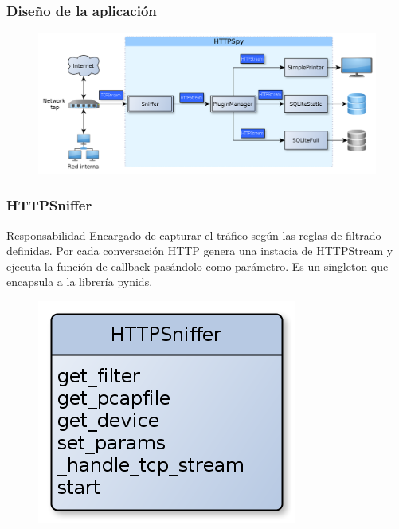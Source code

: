 \documentclass[10pt,a4paper]{beamer}
\begin{document}
\begin{frame}

	\frametitle{Diseño de la aplicación}

	\begin{figure}[hbtp]
		\includegraphics[scale=0.22]{img/modelo.png}
	\end{figure}

\end{frame}

\begin{frame}

	\frametitle{HTTPSniffer}
	\begin{block}{Responsabilidad}
		Encargado de capturar el tráfico según las reglas de filtrado definidas.
		Por cada conversación HTTP genera una instacia de HTTPStream y ejecuta la función de callback pasándolo como parámetro. Es un singleton que encapsula a la librería pynids.
	\end{block}
	\begin{figure}[hbtp]
		\includegraphics[scale=0.40]{img/HTTPSniffer.png} 
	\end{figure}
\end{frame}
\end{document}
